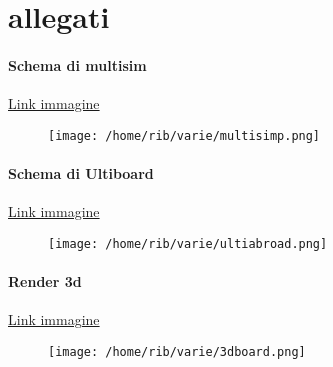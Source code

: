 \documentclass{article}
\begin{document}
\section{allegati}
\paragraph{Schema di multisim}
\href{https://drive.google.com/file/d/1VOPnspiu-4T2ZOR6uaUWNH1DUEd0fUcg/view?usp=sharing}{Link immagine}
\begin{figure}[H]
    \centering
        \texttt{[image: /home/rib/varie/multisimp.png]}
        \label{multisimp}
\end{figure}

\paragraph{Schema di Ultiboard}
\href{https://drive.google.com/file/d/1ZlJ_AIXvgzdlvAawX5noBu48i03zm5dP/view?usp=sharing}{Link immagine}
\begin{figure}[H]
    \centering
        \texttt{[image: /home/rib/varie/ultiabroad.png]}
        \label{ultiabroad}
\end{figure}

\paragraph{Render 3d}
\href{https://drive.google.com/file/d/1EMIzjUSU50ij58dLTjCctJGQM4YIgIii/view?usp=sharing}{Link immagine}
\begin{figure}[H]
    \centering
        \texttt{[image: /home/rib/varie/3dboard.png]}
        \label{3d}
\end{figure}
\end{document}
